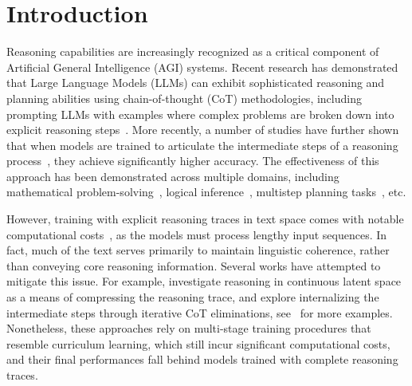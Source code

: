 \section{Introduction}

Reasoning capabilities are increasingly recognized as a critical component of Artificial General Intelligence (AGI) systems. Recent research has demonstrated that Large Language Models (LLMs) can exhibit sophisticated reasoning and planning abilities using chain-of-thought (CoT) methodologies, including prompting LLMs 
with examples where complex problems are broken down into explicit reasoning steps~\cite{wei2022chain, chen2022program, yao2024tree}.
More recently, a number of studies have further shown that when models are trained to articulate the intermediate steps of a reasoning process~\cite{nye2021show, lehnert2024beyond}, they achieve significantly higher accuracy. The effectiveness of this approach has been demonstrated across multiple domains, including mathematical problem-solving~\cite{yue2023mammoth, gandhi2024stream, yu2023metamath, tong2024dart}, logical inference~\cite{zebralogic2024, dziri2024faith}, multistep planning tasks~\cite{lehnert2024beyond, su2024dualformer}, etc. 

However, training with explicit reasoning traces in text space comes with notable computational costs~\cite{deng2023implicit, deng2024explicit}, as the models must process lengthy input sequences. In fact, much of the text serves primarily to maintain linguistic coherence, rather than conveying core reasoning information. Several works have attempted to mitigate this issue. For example,
\citet{hao2024training} investigate reasoning in continuous latent space as a means of compressing the reasoning trace, and
\citet{deng2024explicit} explore internalizing the intermediate steps through iterative CoT eliminations, see~ for more examples. Nonetheless, these approaches rely on multi-stage training procedures that resemble curriculum learning,  which still incur significant computational costs, and their final performances fall behind models trained with complete reasoning traces.

